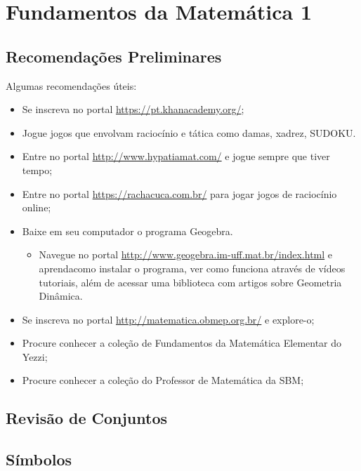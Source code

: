 \chapter{Fundamentos da Matemática 1}

\section*{Recomendações Preliminares}
Algumas recomendações úteis:
\begin{itemize}
    \item Se inscreva no portal \url{https://pt.khanacademy.org/};
    \item Jogue jogos que envolvam raciocínio e tática como damas, xadrez, SUDOKU.
    \item Entre no portal \url{http://www.hypatiamat.com/} e jogue sempre que tiver tempo;
    \item Entre no portal \url{https://rachacuca.com.br/} para jogar jogos de raciocínio online;
    \item Baixe em seu computador o programa Geogebra.
    \begin{itemize}
        \item Navegue no portal \url{http://www.geogebra.im-uff.mat.br/index.html} e aprenda\linebreak como instalar o programa, ver como funciona através de vídeos tutoriais, além de acessar uma biblioteca com artigos sobre Geometria Dinâmica.
    \end{itemize}
    \item Se inscreva no portal \url{http://matematica.obmep.org.br/} e explore-o;
    \item Procure conhecer a coleção de Fundamentos da Matemática Elementar do Yezzi;
    \item Procure conhecer a coleção do Professor de Matemática da SBM;
\end{itemize}

\section{Revisão de Conjuntos}

\section*{Símbolos}

